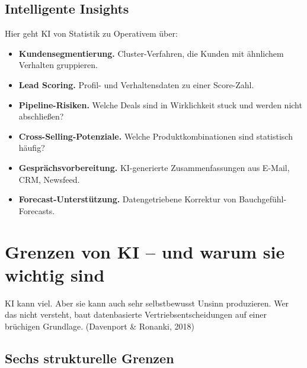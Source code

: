 \documentclass[11pt,a4paper,oneside]{article}
\newcommand{\quelle}[1]{{\footnotesize\color{lpGray}(#1)}}
\begin{document}
\subsection{Intelligente Insights}

Hier geht KI von Statistik zu Operativem über:

\begin{itemize}
  \item \textbf{Kundensegmentierung.} Cluster-Verfahren, die Kunden mit ähnlichem Verhalten gruppieren.
  \item \textbf{Lead Scoring.} Profil- und Verhaltensdaten zu einer Score-Zahl.
  \item \textbf{Pipeline-Risiken.} Welche Deals sind in Wirklichkeit stuck und werden nicht abschließen?
  \item \textbf{Cross-Selling-Potenziale.} Welche Produktkombinationen sind statistisch häufig?
  \item \textbf{Gesprächsvorbereitung.} KI-generierte Zusammenfassungen aus E-Mail, CRM, Newsfeed.
  \item \textbf{Forecast-Unterstützung.} Datengetriebene Korrektur von Bauchgefühl-Forecasts.
\end{itemize}

\section{Grenzen von KI -- und warum sie wichtig sind}

KI kann viel. Aber sie kann auch sehr selbstbewusst Unsinn produzieren. Wer das nicht versteht, baut datenbasierte Vertriebsentscheidungen auf einer brüchigen Grundlage. \quelle{Davenport \& Ronanki, 2018}

\subsection{Sechs strukturelle Grenzen}
\end{document}
